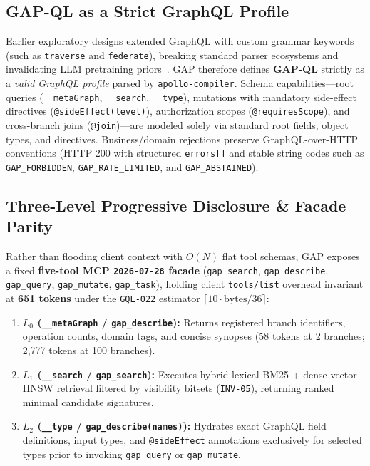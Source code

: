 \documentclass[10pt,twocolumn]{article}
\begin{document}
\subsection{GAP-QL as a Strict GraphQL Profile}
Earlier exploratory designs extended GraphQL with custom grammar keywords (such as \texttt{traverse} and \texttt{federate}), breaking standard parser ecosystems and invalidating LLM pretraining priors~\cite{hartig2018graphql}. GAP therefore defines \textbf{GAP-QL} strictly as a \emph{valid GraphQL profile} parsed by \texttt{apollo-compiler}. Schema capabilities—root queries (\texttt{\_\_metaGraph}, \texttt{\_\_search}, \texttt{\_\_type}), mutations with mandatory side-effect directives (\texttt{@sideEffect(level)}), authorization scopes (\texttt{@requiresScope}), and cross-branch joins (\texttt{@join})—are modeled solely via standard root fields, object types, and directives. Business/domain rejections preserve GraphQL-over-HTTP conventions (HTTP 200 with structured \texttt{errors[]} and stable string codes such as \texttt{GAP\_FORBIDDEN}, \texttt{GAP\_RATE\_LIMITED}, and \texttt{GAP\_ABSTAINED}).

\subsection{Three-Level Progressive Disclosure \& Facade Parity}
Rather than flooding client context with $O(N)$ flat tool schemas, GAP exposes a fixed \textbf{five-tool MCP \texttt{2026-07-28} facade} (\texttt{gap\_search}, \texttt{gap\_describe}, \texttt{gap\_query}, \texttt{gap\_mutate}, \texttt{gap\_task}), holding client \texttt{tools/list} overhead invariant at \textbf{651 tokens} under the \texttt{GQL-022} estimator $\lceil 10 \cdot \text{bytes} / 36 \rceil$:
\begin{enumerate}
  \item \textbf{$L_0$ (\texttt{\_\_metaGraph} / \texttt{gap\_describe}):} Returns registered branch identifiers, operation counts, domain tags, and concise synopses (58 tokens at 2 branches; 2,777 tokens at 100 branches).
  \item \textbf{$L_1$ (\texttt{\_\_search} / \texttt{gap\_search}):} Executes hybrid lexical BM25 + dense vector HNSW retrieval filtered by visibility bitsets (\texttt{INV-05}), returning ranked minimal candidate signatures.
  \item \textbf{$L_2$ (\texttt{\_\_type} / \texttt{gap\_describe(names)}):} Hydrates exact GraphQL field definitions, input types, and \texttt{@sideEffect} annotations exclusively for selected types prior to invoking \texttt{gap\_query} or \texttt{gap\_mutate}.
\end{enumerate}
\end{document}
